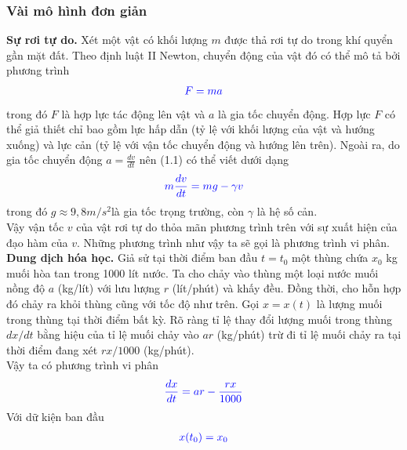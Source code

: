 \documentclass[13pt,a4paper]{article}
\begin{document}
			\subsubsection{Vài mô hình đơn giản}
				\textbf{Sự rơi tự do.} Xét một vật có khối lượng $m$ được thả rơi tự do trong khí quyển gần mặt đất. Theo định luật II Newton, chuyển động của vật đó có thể mô tả bởi phương trình
				\begin{align*}
					\color{blue}
						F = ma
					\color{blue}
				\end{align*}
				trong đó $F$ là hợp lực tác động lên vật và $a$ là gia tốc chuyển động. Hợp lực $F$ có thể giả thiết chỉ bao gồm lực hấp dẫn (tỷ lệ với khối lượng của vật và hướng xuống) và lực cản (tỷ lệ với vận tốc chuyển động và hướng lên trên). Ngoài ra, do gia tốc chuyển	động $a = \frac{dv}{dt}$ nên (1.1) có thể viết dưới dạng
				\begin{align*}
					\color{blue}
						m\frac{dv}{dt} = mg - \gamma v
					\color{blue}
				\end{align*}
				trong đó $g \approx 9,8 m/s^2$là gia tốc trọng trường, còn $\gamma$ là hệ số cản. \\
				Vậy vận tốc $v$ của vật rơi tự do thỏa mãn phương trình trên với sự xuất hiện của đạo hàm của $v$. Những phương trình như vậy ta sẽ gọi là phương trình vi phân.\\
				\textbf{Dung dịch hóa học.} Giả sử tại thời điểm ban đầu $t = t_0$ một thùng chứa $x_0$ kg muối hòa tan trong 1000 lít nước. Ta cho chảy vào thùng một loại nước muối nồng độ $a$ (kg/lít) với lưu lượng $r$ (lít/phút) và khấy đều. Đồng thời, cho hỗn hợp đó chảy ra khỏi thùng cũng với tốc độ như trên. Gọi $x = x(t)$ là lượng muối trong thùng tại thời điểm bất kỳ. Rõ ràng tỉ lệ thay đổi lượng muối trong thùng $dx/dt$ bằng hiệu của tỉ lệ muối chảy vào $ar$ (kg/phút) trừ đi tỉ lệ muối chảy ra tại thời điểm đang xét $rx/1000$ (kg/phút). \\
				Vậy ta có phương trình vi phân
				\begin{align*}
					\color{blue}
						\frac{dx}{dt} = ar - \frac{rx}{1000}
					\color{blue}
				\end{align*}
				Với dữ kiện ban đầu
				\begin{align*}
					\color{blue}
						x(t_0) = x_0
					\color{blue}
				\end{align*}
\end{document}
